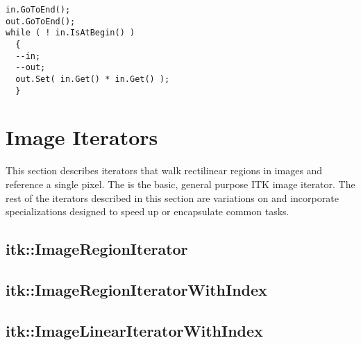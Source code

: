 \small
\begin{verbatim}
in.GoToEnd();
out.GoToEnd();
while ( ! in.IsAtBegin() )
  {
  --in;
  --out;
  out.Set( in.Get() * in.Get() );
  }
\end{verbatim}
\normalsize





\section{Image Iterators}
\label{sec:ImageIterators}
This section describes iterators that walk rectilinear regions in images and
reference a single pixel.  The  is the basic,
general purpose ITK image iterator.  The rest of the iterators described in
this section are variations on  and
incorporate specializations designed to speed up or encapsulate common tasks.


\subsection{itk::ImageRegionIterator}
\label{sec:itkImageRegionIterator}


\subsection{itk::ImageRegionIteratorWithIndex}
\label{sec:itkImageRegionIteratorWithIndex}


\subsection{itk::ImageLinearIteratorWithIndex}
\label{sec:itkImageLinearIteratorWithIndex}



